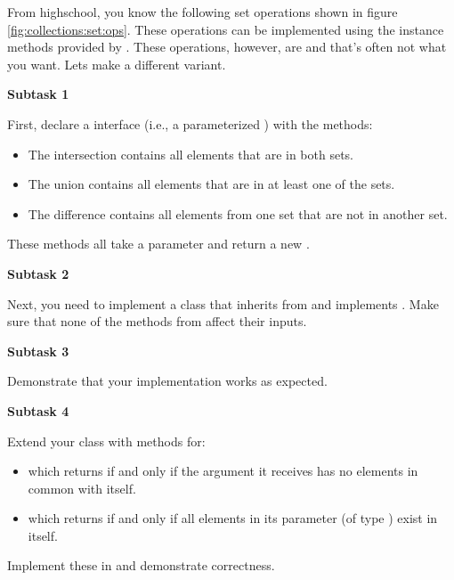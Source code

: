 From highschool, you know the following set operations shown in figure \ref{fig:collections:set:ops}. These operations can be implemented using the instance methods provided by . These operations, however, are  and that's often not what you want. Lets make a different variant.

\textbf{Subtask 1}

First, declare a  interface (i.e., a parameterized ) with the methods:
\begin{itemize}
  \item {} The intersection contains all elements that are in both sets.
  \item {} The union contains all elements that are in at least one of the sets.
  \item {} The difference contains all elements from one set that are not in another set.
\end{itemize}

These methods all take a  parameter and return a new .

\textbf{Subtask 2}

Next, you need to implement a  class that inherits from  and implements . Make sure that none of the methods from  affect their inputs.

\textbf{Subtask 3}

Demonstrate that your implementation works as expected.

\textbf{Subtask 4}

Extend your  class with methods for:
\begin{itemize}
  \item {} which returns  if and only if the  argument it receives has no elements in common with itself.
  \item {} which returns  if and only if all elements in its parameter (of type ) exist in itself.
\end{itemize}

Implement these in  and demonstrate correctness.
